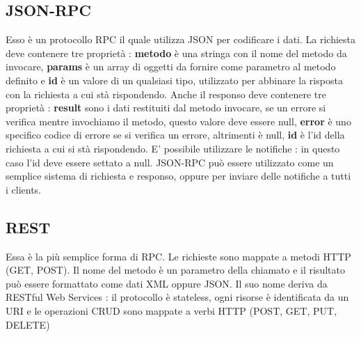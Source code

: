 \documentclass[12pt]{report}
\begin{document}
\subsection{JSON-RPC}
Esso è un protocollo RPC il quale utilizza JSON per codificare i dati. La richiesta deve contenere tre proprietà : \textbf{metodo} è una stringa con il nome del metodo da invocare, \textbf{params} è un array di oggetti da fornire come parametro al metodo definito e \textbf{id} è un valore di un qualsiasi tipo, utilizzato per abbinare la risposta con la richiesta a cui stà rispondendo. Anche il responso deve contenere tre proprietà : \textbf{result} sono i dati restituiti dal metodo invocare, se un errore si verifica mentre invochiamo il metodo, questo valore deve essere null, \textbf{error} è uno specifico codice di errore se si verifica un errore, altrimenti è null, \textbf{id} è l'id della richiesta a cui si stà rispondendo. E' possibile utilizzare le notifiche : in questo caso l'id deve essere settato a null. JSON-RPC può essere utilizzato come un semplice sistema di richiesta e responso, oppure per inviare delle notifiche a tutti i clients.
\subsection{REST}
Essa è la più semplice forma di RPC. Le richieste sono mappate a metodi HTTP (GET, POST). Il nome del metodo è un parametro della chiamato e il risultato può essere formattato come dati XML oppure JSON. Il suo nome deriva da RESTful Web Services : il protocollo è stateless, ogni risorse è identificata da un URI e le operazioni CRUD sono mappate a verbi HTTP (POST, GET, PUT, DELETE)
\end{document}
